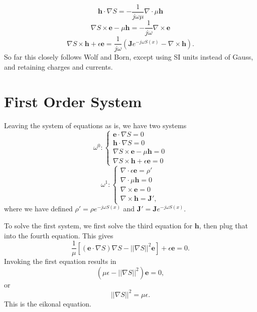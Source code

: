 \documentclass{article}
\newcommand{\norm}[1]{||#1||}
\theoremstyle{plain}
\begin{document}
\begin{equation}\label{eq:max2}
	\mathbf{h}\cdot\nabla S = -\frac{1}{j\omega\mu}\nabla\cdot\mu\mathbf{h}
\end{equation}
\begin{equation}\label{eq:max3}
	\nabla S\times\mathbf{e} - \mu\mathbf{h} = -\frac{1}{j\omega}\nabla\times\mathbf{e}
\end{equation}
\begin{equation}\label{eq:max4}
	\nabla S\times\mathbf{h} + \epsilon\mathbf{e} = \frac{1}{j\omega}\left( \mathbf{J}e^{-j\omega S(x)} - \nabla\times\mathbf{h} \right).
\end{equation}
So far this closely follows Wolf and Born, except using SI units instead of Gauss, and retaining charges and currents.


\section{First Order System}

Leaving the system of equations as is, we have two systems
\begin{equation}
	\omega^0:
	\begin{cases}
		\mathbf{e}\cdot\nabla S = 0 \\
		\mathbf{h}\cdot\nabla S = 0 \\
		\nabla S\times\mathbf{e} - \mu\mathbf{h} = 0 \\
		\nabla S\times\mathbf{h} + \epsilon\mathbf{e} = 0
	\end{cases}
\end{equation}
\begin{equation}
	\omega^1:
	\begin{cases}
		\nabla\cdot\epsilon\mathbf{e} = \rho' \\
		\nabla\cdot\mu\mathbf{h} = 0 \\
		\nabla\times\mathbf{e} = 0 \\
		\nabla\times\mathbf{h} = \mathbf{J}',
	\end{cases}
\end{equation}
where we have defined $\rho' = \rho e^{-j\omega S(x)}$ and $\mathbf{J}' = \mathbf{J}e^{-j\omega S(x)}$.

To solve the first system, we first solve the third equation for $\mathbf{h}$, then plug that into the fourth equation. This gives
\begin{equation}
	\frac{1}{\mu}\left[ \left(\mathbf{e}\cdot\nabla S\right)\nabla S - \norm{\nabla S}^2\mathbf{e}\right] + \epsilon\mathbf{e} = 0.
\end{equation}
Invoking the first equation results in
\begin{equation}
	\left(\mu\epsilon - \norm{\nabla S}^2\right)\mathbf{e} = 0,
\end{equation}
or
\begin{equation}
	\norm{\nabla S}^2 = \mu\epsilon.
\end{equation}
This is the eikonal equation.
\end{document}
